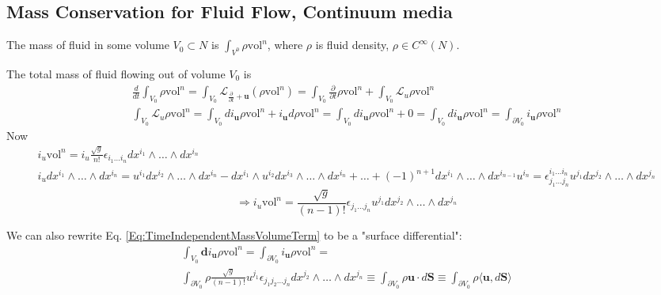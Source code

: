 \documentclass[10pt]{amsart}
\begin{document}
\begin{multicols*}{2}
\subsection{Mass Conservation for Fluid Flow, Continuum media}

The mass of fluid in some volume $V_0 \subset N$ is $\int_{V^0} \rho \text{vol}^n$, where $\rho$ is fluid density, $\rho \in C^{\infty}(N)$.  

The total mass of fluid flowing out of volume $V_0$ is 
\[
\begin{gathered}
\frac{d}{dt} \int_{V_0} \rho \text{vol}^n = \int_{V_0} \mathcal{L}_{\frac{\partial}{\partial t} + \textbf{u}} (\rho \text{vol}^n) = \int_{V_0} \frac{ \partial }{\partial t} \rho \text{vol}^n + \int_{V_0} \mathcal{L}_u \rho \text{vol}^n   \\
\int_{V_0} \mathcal{L}_u \rho \text{vol}^n = \int_{V_0} di_{\mathbf{u}} \rho \text{vol}^n  + i_{\mathbf{u}} d\rho \text{vol}^n = \int_{V_0} di_{\mathbf{u}} \rho \text{vol}^n + 0 = \int_{V_0} di_{\mathbf{u}} \rho \text{vol}^n = \int_{\partial V_0} i_{\mathbf{u}} \rho \text{vol}^n
\end{gathered}
\]  
Now
\[
\begin{gathered}
i_u \text{vol}^n = i_u\frac{\sqrt{g}}{n!} \epsilon_{i_1 \dots i_n} dx^{i_1} \wedge \dots \wedge dx^{i_n} \\ 
i_u dx^{i_1} \wedge \dots \wedge dx^{i_n} = u^{i_1} dx^{i_2} \wedge \dots \wedge dx^{i_n} - dx^{i_1} \wedge u^{i_2} dx^{i_3} \wedge \dots \wedge dx^{i_n} +  \dots + (-1)^{n+1} dx^{i_1} \wedge \dots \wedge dx^{i_{n-1}} u^{i_n} = \epsilon^{i_1 \dots i_n}_{j_1 \dots j_n } u^{j_1 } dx^{j_2} \wedge \dots \wedge dx^{j_n}  
\end{gathered} 
\]
\begin{equation}\label{Eq:TimeIndependentMassVolumeTerm}
\Longrightarrow i_u\text{vol}^n = \frac{ \sqrt{g}}{ (n-1)!} \epsilon_{j_1 \dots j_n} u^{j_1} dx^{j_2} \wedge \dots \wedge dx^{j_n}
\end{equation}

We can also rewrite Eq. \ref{Eq:TimeIndependentMassVolumeTerm} to be a "surface differential":
\begin{equation}
\begin{gathered}
\int_{V_0} \mathbf{d}i_{\mathbf{u}} \rho \text{vol}^n = \int_{\partial V_0} i_{\mathbf{u}} \rho \text{vol}^n = \\
\int_{\partial V_0} \rho \frac{ \sqrt{g}}{ (n-1)!} u^{j_1} \epsilon_{j_1 j_2 \dots j_n} dx^{j_2} \wedge \dots \wedge dx^{j_n} \equiv \int_{\partial V_0} \rho \mathbf{u} \cdot d\mathbf{S} \equiv \int_{\partial V_0} \rho \langle \mathbf{u}, d\mathbf{S} \rangle 
\end{gathered}
\end{equation}



\end{multicols*}
\end{document}
